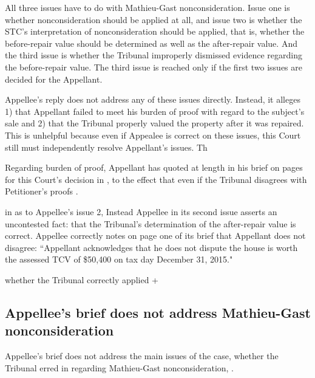 \documentclass[12pt,\documentclassflag]{michiganCourtOfAppealsBrief}
\begin{document}
All three issues have to do with Mathieu-Gast nonconsideration. Issue one is whether nonconsideration should be applied at all, and issue two is whether the STC's interpretation of nonconsideration should be applied, that is, whether the before-repair value should be determined as well as the after-repair value. And the third issue is whether the Tribunal improperly dismissed evidence regarding the before-repair value. The third issue is reached only if the first two issues are decided for the Appellant.

Appellee's reply does not address any of these issues directly. Instead, it alleges 1) that Appellant failed to meet his burden of proof with regard to the subject's sale and 2) that the Tribunal properly valued the property after it was repaired. This is unhelpful because even if Appealee is correct on these issues, this Court still must independently resolve Appellant's issues. Th

Regarding burden of proof, Appellant has quoted at length in his brief on pages for this Court's decision in , to the effect that even if the Tribunal disagrees with Petitioner's proofs
.


in as to Appellee's issue 2, 
Instead Appellee in its second issue asserts an uncontested fact: that the Tribunal's determination of the after-repair value is correct. Appellee correctly notes on page one of its brief that Appellant does not disagree: ``Appellant acknowledges that he does not dispute the house is worth the assessed TCV of \$50,400 on tax day December 31, 2015."



whether the Tribunal correctly applied +




\subsection{Appellee's brief does not address Mathieu-Gast nonconsideration}

Appellee's brief does not address the main issues of the case, whether the Tribunal erred in regarding Mathieu-Gast nonconsideration, \mathieuGast.
\end{document}
